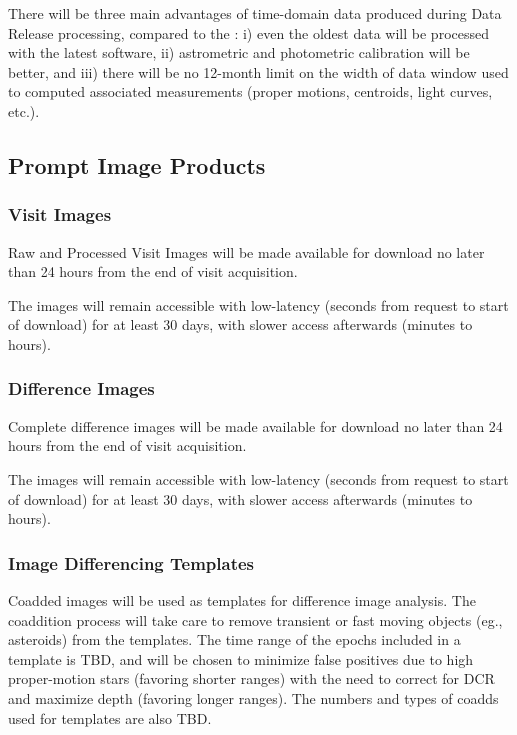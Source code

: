 There will be three main advantages of time-domain data produced during Data Release processing, compared to
the \PPDB:
i) even the oldest data will be processed with the latest software,
ii) astrometric and photometric calibration will be better, and
iii) there will be no 12-month limit on the width of data window used to computed associated \DIAObject
measurements (proper motions, centroids, light curves, etc.). 

\subsection{Prompt Image Products}

\subsubsection{Visit Images}

Raw and Processed Visit Images will be made available for download no later than 24 hours from the end of visit acquisition.

The images will remain accessible with low-latency (seconds from request to start of download) for at least 30 days, with slower access afterwards (minutes to hours).

\subsubsection{Difference Images}
\label{sec:diffims}

Complete difference images will be made available for download no later than 24 hours from the end of visit acquisition.

The images will remain accessible with low-latency (seconds from request to start of download) for at least 30 days, with slower access afterwards (minutes to hours).

\subsubsection{Image Differencing Templates}
\label{sec:templates}

Coadded images will be used as templates for difference image analysis.
The coaddition process will take care to remove transient or fast moving objects (eg., asteroids) from the templates.
The time range of the epochs included in a template is TBD, and will be chosen to minimize false positives due to high proper-motion stars (favoring shorter ranges) with the need to correct for DCR and maximize depth (favoring longer ranges).
The numbers and types of coadds used for templates are also TBD.

